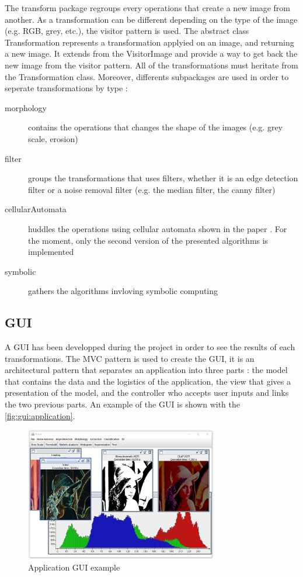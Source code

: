 The transform package regroups every operations that create a new image from another. As a transformation can be different depending on the type of the image (e.g. RGB, grey, etc.), the visitor pattern is used. The abstract class Transformation represents a transformation applyied on an image, and returning a new image. It extends from the VisitorImage and provide a way to get back the new image from the visitor pattern. All of the transformations must heritate from the Transformation class. Moreover, differents subpackages are used in order to seperate transformations by type : 
\begin{description}
	\item[morphology] contains the operations that changes the shape of the images (e.g. grey scale, erosion)
	\item[filter] groups the transformations that uses filters, whether it is an edge detection filter or a noise removal filter (e.g. the median filter, the canny filter)
	\item[cellularAutomata] huddles the operations using cellular automata shown in the paper \cite{bib:filter:CA}. For the moment, only the second version of the presented algorithms is implemented
	\item[symbolic] gathers the algorithms invloving symbolic computing
\end{description}






\subsection{GUI}

A \gls{GUI} has been developped during the project in order to see the results of each transformations. The \gls{MVC} pattern is used to create the \gls{GUI}, it is an architectural pattern that separates an application into three parts : the model that contains the data and the logistics of the application, the view that gives a presentation of the model, and the controller who accepts user inputs and links the two previous parts. An example of the \gls{GUI} is shown with the \vref{fig:gui:application}.


\begin{figure}[ht]
	\centering
	\includegraphics[width=0.75\textwidth]{images/application/application}
	\caption{Application GUI example}
	\label{fig:gui:application}
\end{figure}


